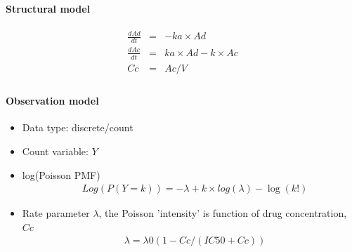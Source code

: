 %
%


\paragraph{Structural model}
\begin{eqnarray}
\frac{dAd}{dt} &=&-ka \times Ad \nonumber \\
\frac{dAc}{dt}&=&ka \times Ad - k \times Ac \nonumber \\ 
Cc &=& Ac/V \nonumber \\ \nonumber
\end{eqnarray}
\paragraph{Observation model}

\begin{itemize}
\item
Data type: discrete/count 
\item
Count variable: $Y$
\item
log(Poisson PMF)
\begin{align}
& Log(P(Y=k)) = -\lambda + k\times log(\lambda) - \log(k!) \nonumber
\end{align}
\item
Rate parameter $\lambda$, the Poisson 'intensity' is function of drug concentration, $Cc$
\begin{align}
& \lambda = \lambda0 (1 - Cc/(IC50 + Cc)) \nonumber
\end{align}
\end{itemize}

